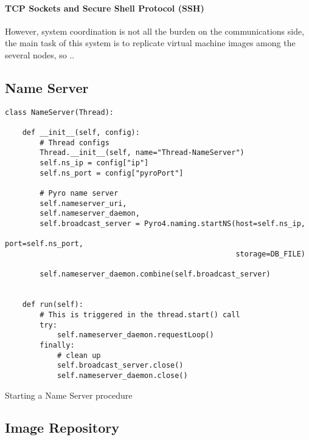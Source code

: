 \paragraph{TCP Sockets and Secure Shell Protocol (SSH)}
\label{par:rep_tcp_sockets}
However, system coordination is not all the burden on the communications side, the main task of this system is to replicate virtual machine images among the several nodes, so ..


\subsection{Name Server}
\label{sub:rep_name_server}


\begin{listing}[h!]
\begin{verbatim}
class NameServer(Thread):

	def __init__(self, config):
		# Thread configs
        Thread.__init__(self, name="Thread-NameServer")
        self.ns_ip = config["ip"]
        self.ns_port = config["pyroPort"]

        # Pyro name server
        self.nameserver_uri, 
        self.nameserver_daemon, 
        self.broadcast_server = Pyro4.naming.startNS(host=self.ns_ip,
                                                     port=self.ns_port,
                                                     storage=DB_FILE)

        self.nameserver_daemon.combine(self.broadcast_server)


	def run(self):
        # This is triggered in the thread.start() call
        try:
            self.nameserver_daemon.requestLoop()
        finally:
            # clean up
            self.broadcast_server.close()
            self.nameserver_daemon.close()
\end{verbatim}
\caption{Starting a Name Server procedure}
\label{listing:icbd_nameserver}
\end{listing}



\subsection{Image Repository}
\label{sub:rep_image_repo}

